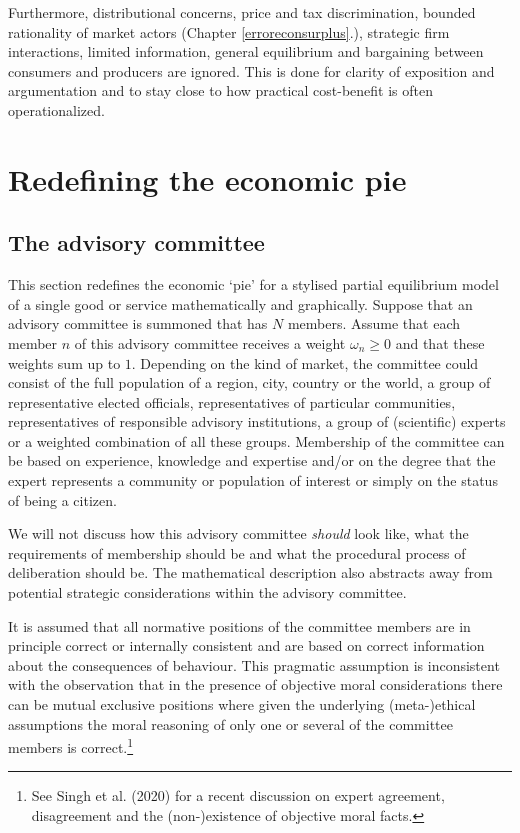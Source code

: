 \documentclass[
]{book}
\begin{document}
Furthermore, distributional concerns, price and tax discrimination, bounded rationality of market actors (Chapter \ref{erroreconsurplus}.), strategic firm interactions, limited information, general equilibrium and bargaining between consumers and producers are ignored. This is done for clarity of exposition and argumentation and to stay close to how practical cost-benefit is often operationalized.

\hypertarget{redefining-the-economic-pie}{%
\section{Redefining the economic pie}\label{redefining-the-economic-pie}}

\hypertarget{the-advisory-committee}{%
\subsection{The advisory committee}\label{the-advisory-committee}}

This section redefines the economic `pie' for a stylised partial equilibrium model of a single good or service mathematically and graphically. Suppose that an advisory committee is summoned that has \(N\) members. Assume that each member \(n\) of this advisory committee receives a weight \(\omega_n \geq 0\) and that these weights sum up to \(1\). Depending on the kind of market, the committee could consist of the full population of a region, city, country or the world, a group of representative elected officials, representatives of particular communities, representatives of responsible advisory institutions, a group of (scientific) experts or a weighted combination of all these groups. Membership of the committee can be based on experience, knowledge and expertise and/or on the degree that the expert represents a community or population of interest or simply on the status of being a citizen.

We will not discuss how this advisory committee \emph{should} look like, what the requirements of membership should be and what the procedural process of deliberation should be. The mathematical description also abstracts away from potential strategic considerations within the advisory committee.

It is assumed that all normative positions of the committee members are in principle correct or internally consistent and are based on correct information about the consequences of behaviour. This pragmatic assumption is inconsistent with the observation that in the presence of objective moral considerations there can be mutual exclusive positions where given the underlying (meta-)ethical assumptions the moral reasoning of only one or several of the committee members is correct.\footnote{See Singh et al. (2020) for a recent discussion on expert agreement, disagreement and the (non-)existence of objective moral facts.}
\end{document}
